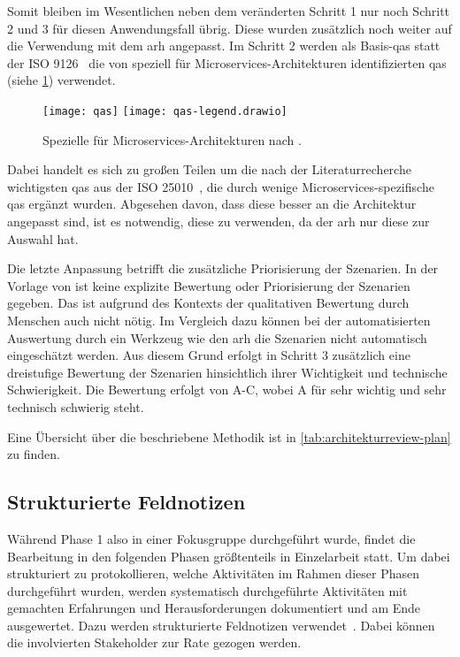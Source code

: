 Somit bleiben im Wesentlichen neben dem veränderten Schritt 1 nur noch Schritt 2 und 3 für diesen Anwendungsfall übrig.
Diese wurden zusätzlich noch weiter auf die Verwendung mit dem \gls{arh} angepasst.
Im Schritt 2 werden als Basis-\glspl{qa} statt der ISO 9126~\cite{ISO-9126} die von  speziell für Microservices-Architekturen identifizierten \glspl{qa} (siehe \cref{fig:qas}) verwendet.
\begin{figure}[!h]
	\centering
	\texttt{[image: qas]}
	\texttt{[image: qas-legend.drawio]}
	\caption[Spezielle  für Microservices-Architekturen]{
		Spezielle  für Microservices-Architekturen nach .
	}
	\label{fig:qas}
\end{figure}
Dabei handelt es sich zu großen Teilen um die nach der Literaturrecherche wichtigsten \glspl{qa} aus der ISO 25010~\cite{ISO-25010}, die durch wenige Microservices-spezifische \glspl{qa} ergänzt wurden.
Abgesehen davon, dass diese besser an die Architektur angepasst sind, ist es notwendig, diese zu verwenden, da der \gls{arh} nur diese zur Auswahl hat.

Die letzte Anpassung betrifft die zusätzliche Priorisierung der Szenarien.
In der Vorlage von  ist keine explizite Bewertung oder Priorisierung der Szenarien gegeben.
Das ist aufgrund des Kontexts der qualitativen Bewertung durch Menschen auch nicht nötig.
Im Vergleich dazu können bei der automatisierten Auswertung durch ein Werkzeug wie den \gls{arh} die Szenarien nicht automatisch eingeschätzt werden.
Aus diesem Grund erfolgt in Schritt 3 zusätzlich eine dreistufige Bewertung der Szenarien hinsichtlich ihrer Wichtigkeit und technische Schwierigkeit.
Die Bewertung erfolgt von A-C, wobei A für sehr wichtig und sehr technisch schwierig steht.

Eine Übersicht über die beschriebene Methodik ist in \cref{tab:architekturreview-plan} zu finden.



\subsection{Strukturierte Feldnotizen}
\label{sec:structured-field-notes}

Während Phase 1 also in einer Fokusgruppe durchgeführt wurde, findet die Bearbeitung in den folgenden Phasen größtenteils in Einzelarbeit statt.
Um dabei strukturiert zu protokollieren, welche Aktivitäten im Rahmen dieser Phasen durchgeführt wurden, werden systematisch durchgeführte Aktivitäten mit gemachten Erfahrungen und Herausforderungen dokumentiert und am Ende ausgewertet.
Dazu werden strukturierte Feldnotizen verwendet~\cite{seaman2008qualitative}.
Dabei können die involvierten Stakeholder zur Rate gezogen werden.


